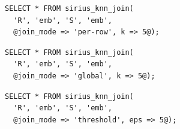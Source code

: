 \begin{table}[t]
    \begin{minipage}[c]{\dimexpr\textwidth-1.2em\relax}
        \begin{tcbraster}[raster columns=3, raster equal height=rows, raster before skip=0pt, raster after skip=0pt]
            \begin{tcolorbox}[vjcard, vjmode=vjperrow]
                \begin{lstlisting}[style=vj,label={lst:tvf-per-row}]
SELECT * FROM sirius_knn_join(
  'R', 'emb', 'S', 'emb',
  @join_mode => 'per-row', k => 5@);
\end{lstlisting}
            \end{tcolorbox}
            \begin{tcolorbox}[vjcard, vjmode=vjglobal]
                \begin{lstlisting}[style=vj,label={lst:tvf-global}]
SELECT * FROM sirius_knn_join(
  'R', 'emb', 'S', 'emb',
  @join_mode => 'global', k => 5@);
\end{lstlisting}
            \end{tcolorbox}
            \begin{tcolorbox}[vjcard, vjmode=vjthresh]
                \begin{lstlisting}[style=vj,label={lst:tvf-threshold}]
SELECT * FROM sirius_knn_join(
  'R', 'emb', 'S', 'emb',
  @join_mode => 'threshold', eps => 5@);
\end{lstlisting}
            \end{tcolorbox}
        \end{tcbraster}
    \end{minipage}
    \vjrule{\lightrulewidth}


\end{table}
